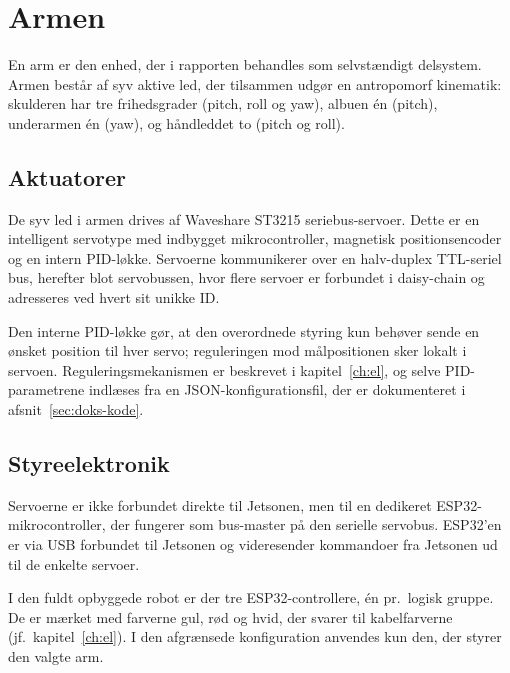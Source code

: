 \section{Armen}
\label{sec:arm-delsystem}

En arm er den enhed, der i rapporten behandles som selvstændigt delsystem.
Armen består af syv aktive led, der tilsammen udgør en antropomorf
kinematik: skulderen har tre frihedsgrader (pitch, roll og yaw), albuen
én (pitch), underarmen én (yaw), og håndleddet to (pitch og roll).

\subsection{Aktuatorer}

De syv led i armen drives af Waveshare ST3215 seriebus-servoer.
Dette er en intelligent servotype med indbygget mikrocontroller, magnetisk
positionsencoder og en intern PID-løkke. Servoerne kommunikerer over en
halv-duplex TTL-seriel bus, herefter blot servobussen, hvor flere
servoer er forbundet i daisy-chain og adresseres ved hvert sit
unikke ID.

Den interne PID-løkke gør, at den overordnede styring kun behøver sende
en ønsket position til hver servo; reguleringen mod målpositionen sker
lokalt i servoen. Reguleringsmekanismen er beskrevet i
kapitel~\ref{ch:el}, og selve PID-parametrene indlæses fra en
JSON-konfigurationsfil, der er dokumenteret i
afsnit~\ref{sec:doks-kode}.

\subsection{Styreelektronik}

Servoerne er ikke forbundet direkte til Jetsonen, men til en dedikeret
ESP32-mikrocontroller, der fungerer som bus-master på den serielle
servobus. ESP32'en er via USB forbundet til Jetsonen og videresender
kommandoer fra Jetsonen ud til de enkelte servoer.

I den fuldt opbyggede robot er der tre ESP32-controllere, én pr.\
logisk gruppe. De er mærket med farverne gul, rød og hvid, der svarer
til kabelfarverne (jf.\ kapitel~\ref{ch:el}). I den afgrænsede
konfiguration anvendes kun den, der styrer den valgte arm.


